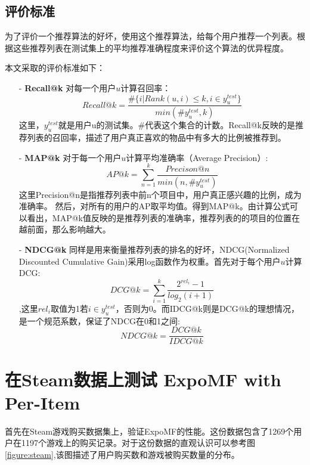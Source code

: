 \documentclass[notitlepage,cs4size,punct,oneside]{ctexrep}
\numberwithin{equation}{chapter}
\theoremstyle{mystyle}
\begin{document}
\subsection{评价标准}
为了评价一个推荐算法的好坏，使用这个推荐算法，给每个用户推荐一个列表。根据这些推荐列表在测试集上的平均推荐准确程度来评价这个算法的优异程度。

本文采取的评价标准如下：

\begin{itemize}
	\item[-] \textbf{Recall@k} 对每一个用户$u$计算召回率：
	$$Recall@k=\frac{\#\{i|Rank(u,i)\leq k , i\in y_u^{test}\}}{min(\#y_{u}^{test},k)}$$
	这里，$y_u^{test}$就是用户u的测试集。\#代表这个集合的计数。Recall@k反映的是推荐列表的召回率，描述了用户真正喜欢的物品中有多大的比例被推荐到。
	\item[-] \textbf{MAP@k} 对于每一个用户$u$计算平均准确率（Average Precision）:
	$$AP@k=\sum_{n=1}^k\frac{Precison@n}{min(n,\#y_{u}^{test})}$$
	这里Precision@n是指推荐列表中前n个项目中，用户真正感兴趣的比例，成为准确率。
	然后，对所有的用户的AP取平均值。得到MAP@k。由计算公式可以看出，MAP@k值反映的是推荐列表的准确率，推荐列表的的项目的位置在越前面，那么影响越大。
	\item[-] \textbf{NDCG@k} 同样是用来衡量推荐列表的排名的好坏，NDCG(Normalized Discounted Cumulative Gain)采用log函数作为权重。首先对于每个用户$u$计算DCG:
	$$DCG@k=\sum_{i=1}^k\frac{2^{rel_i}-1}{log_2(i+1)}$$,这里$rel_i$取值为1若$i\in y_u^{test}$，否则为0。而IDCG@k则是DCG@k的理想情况，是一个规范系数，保证了NDCG在0和1之间:$$NDCG@k=\frac{DCG@k}{IDCG@k}$$
\end{itemize}

\section{在Steam数据上测试 ExpoMF with Per-Item}
首先在Steam游戏购买数据集上，验证ExpoMF的性能。这份数据包含了1269个用户在1197个游戏上的购买记录。对于这份数据的直观认识可以参考图\ref{figure:steam},该图描述了用户购买数和游戏被购买数量的分布。
\end{document}
